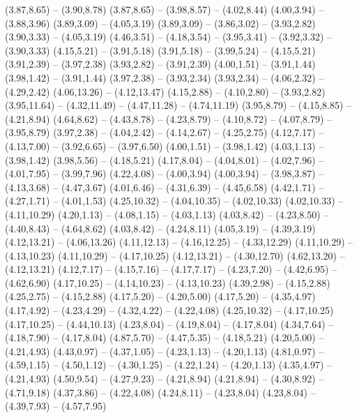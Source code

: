 {  (3.87,8.65) -- (3.90,8.78)
  (3.87,8.65) -- (3.98,8.57) -- (4.02,8.44)
  (4.00,3.94) -- (3.88,3.96)
  (3.89,3.09) -- (4.05,3.19)
  (3.89,3.09) -- (3.86,3.02) -- (3.93,2.82)
  (3.90,3.33) -- (4.05,3.19)
  (4.46,3.51) -- (4.18,3.54) -- (3.95,3.41) -- (3.92,3.32) -- (3.90,3.33)
  (4.15,5.21) -- (3.91,5.18)
  (3.91,5.18) -- (3.99,5.24) -- (4.15,5.21)
  (3.91,2.39) -- (3.97,2.38)
  (3.93,2.82) -- (3.91,2.39)
  (4.00,1.51) -- (3.91,1.44)
  (3.98,1.42) -- (3.91,1.44)
  (3.97,2.38) -- (3.93,2.34)
  (3.93,2.34) -- (4.06,2.32) -- (4.29,2.42)
  (4.06,13.26) -- (4.12,13.47)
  (4.15,2.88) -- (4.10,2.80) -- (3.93,2.82)
  (3.95,11.64) -- (4.32,11.49) -- (4.47,11.28) -- (4.74,11.19)
  (3.95,8.79) -- (4.15,8.85) -- (4.21,8.94)
  (4.64,8.62) -- (4.43,8.78) -- (4.23,8.79) -- (4.10,8.72) -- (4.07,8.79) -- (3.95,8.79)
  (3.97,2.38) -- (4.04,2.42) -- (4.14,2.67) -- (4.25,2.75)
  (4.12,7.17) -- (4.13,7.00) -- (3.92,6.65) -- (3.97,6.50)
  (4.00,1.51) -- (3.98,1.42)
  (4.03,1.13) -- (3.98,1.42)
  (3.98,5.56) -- (4.18,5.21)
  (4.17,8.04) -- (4.04,8.01) -- (4.02,7.96) -- (4.01,7.95) -- (3.99,7.96)
  (4.22,4.08) -- (4.00,3.94)
  (4.00,3.94) -- (3.98,3.87) -- (4.13,3.68) -- (4.47,3.67)
  (4.01,6.46) -- (4.31,6.39) -- (4.45,6.58)
  (4.42,1.71) -- (4.27,1.71) -- (4.01,1.53)
  (4.25,10.32) -- (4.04,10.35) -- (4.02,10.33)
  (4.02,10.33) -- (4.11,10.29)
  (4.20,1.13) -- (4.08,1.15) -- (4.03,1.13)
  (4.03,8.42) -- (4.23,8.50) -- (4.40,8.43) -- (4.64,8.62)
  (4.03,8.42) -- (4.24,8.11)
  (4.05,3.19) -- (4.39,3.19)
  (4.12,13.21) -- (4.06,13.26)
  (4.11,12.13) -- (4.16,12.25) -- (4.33,12.29)
  (4.11,10.29) -- (4.13,10.23)
  (4.11,10.29) -- (4.17,10.25)
  (4.12,13.21) -- (4.30,12.70)
  (4.62,13.20) -- (4.12,13.21)
  (4.12,7.17) -- (4.15,7.16) -- (4.17,7.17) -- (4.23,7.20) -- (4.42,6.95) -- (4.62,6.90)
  (4.17,10.25) -- (4.14,10.23) -- (4.13,10.23)
  (4.39,2.98) -- (4.15,2.88)
  (4.25,2.75) -- (4.15,2.88)
  (4.17,5.20) -- (4.20,5.00)
  (4.17,5.20) -- (4.35,4.97)
  (4.17,4.92) -- (4.23,4.29) -- (4.32,4.22) -- (4.22,4.08)
  (4.25,10.32) -- (4.17,10.25)
  (4.17,10.25) -- (4.44,10.13)
  (4.23,8.04) -- (4.19,8.04) -- (4.17,8.04)
  (4.34,7.64) -- (4.18,7.90) -- (4.17,8.04)
  (4.87,5.70) -- (4.47,5.35) -- (4.18,5.21)
  (4.20,5.00) -- (4.21,4.93)
  (4.43,0.97) -- (4.37,1.05) -- (4.23,1.13) -- (4.20,1.13)
  (4.81,0.97) -- (4.59,1.15) -- (4.50,1.12) -- (4.30,1.25) -- (4.22,1.24) -- (4.20,1.13)
  (4.35,4.97) -- (4.21,4.93)
  (4.50,9.54) -- (4.27,9.23) -- (4.21,8.94)
  (4.21,8.94) -- (4.30,8.92) -- (4.71,9.18)
  (4.37,3.86) -- (4.22,4.08)
  (4.24,8.11) -- (4.23,8.04)
  (4.23,8.04) -- (4.39,7.93) -- (4.57,7.95)
}
